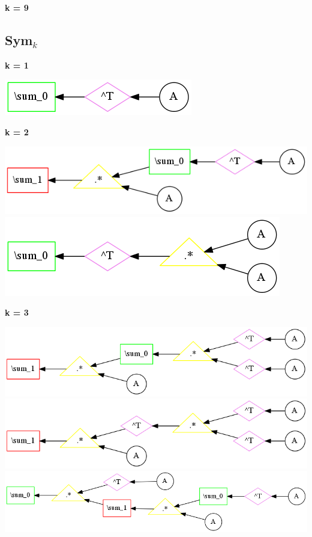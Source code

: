 {\bf k = 9}




\subsection{{\bf Sym$_k$}}



{\bf k = 1}


\begin{center}
\includegraphics[width=0.45\linewidth]{trees/Sym_1_horizontal_0.png}
\end{center}


{\bf k = 2}


\begin{center}
\includegraphics[width=0.45\linewidth]{trees/Sym_2_horizontal_0.png}
\includegraphics[width=0.45\linewidth]{trees/Sym_2_horizontal_1.png}
\end{center}


{\bf k = 3}


\begin{center}
\includegraphics[width=0.45\linewidth]{trees/Sym_3_horizontal_0.png}
\includegraphics[width=0.45\linewidth]{trees/Sym_3_horizontal_1.png}
\includegraphics[width=0.45\linewidth]{trees/Sym_3_horizontal_2.png}
\end{center}


